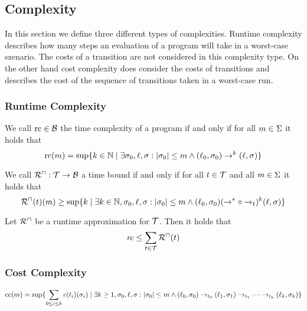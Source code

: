 \subsection{Complexity}

In this section we define three different types of complexities.
Runtime complexity describes how many steps an evaluation of a program will take in a worst-case szenario.
The costs of a transition are not considered in this complexity type.
On the other hand cost complexity does consider the costs of transitions and describes the cost of the sequence of transitions taken in a worst-case run.

\subsubsection{Runtime Complexity}

\begin{definition}
  We call $\text{rc} \in \mathcal{B}$ the time complexity of a program if and only if for all $m \in \Sigma$ it holds that
  \[ \text{rc}(m) = \sup \lbrace  k \in \mathbb{N} \mid \exists \sigma_0, \ell, \sigma: \left|\sigma_0\right| \leq m \wedge (\ell_0, \sigma_0) \rightarrow^k (\ell, \sigma)  \rbrace \]
\end{definition}

\begin{definition}
  We call ${\mathcal{R}^\sqcap}: \mathcal{T} \rightarrow \mathcal{B}$ a time bound if and only if for all $t \in \mathcal{T}$ and all $m \in \Sigma$ it holds that
  \[ {\mathcal{R}^\sqcap}(t)(m) \geq \sup \lbrace  k \mid \exists k \in \mathbb{N}, \sigma_0, \ell, \sigma: \left|\sigma_0\right| \leq m \wedge (\ell_0, \sigma_0) (\rightarrow^* \circ \rightarrow_t)^k (\ell, \sigma)  \rbrace \]
\end{definition}

\begin{theorem}
	Let ${\mathcal{R}^\sqcap}$ be a runtime approximation for $\mathcal{T}$.
	Then it holds that 
	\[ \mathit{rc} \leq \sum_{t \in \mathcal{T}}{\mathcal{R}^\sqcap}(t) \]
\end{theorem}

\subsubsection{Cost Complexity}

\begin{definition}
\[ \text{cc}(m) = \sup \lbrace  \sum_{0 \leq i \leq k} c(t_i)(\sigma_i) \mid \exists k \geq 1, \sigma_0, \ell, \sigma: \left|\sigma_0\right| \leq m \wedge
  (\ell_0, \sigma_0) \rightarrow_{t_0} (\ell_1, \sigma_1) \rightarrow_{t_1} \dots \rightarrow_{t_k} (\ell_k, \sigma_k)  \rbrace \]
\end{definition}

